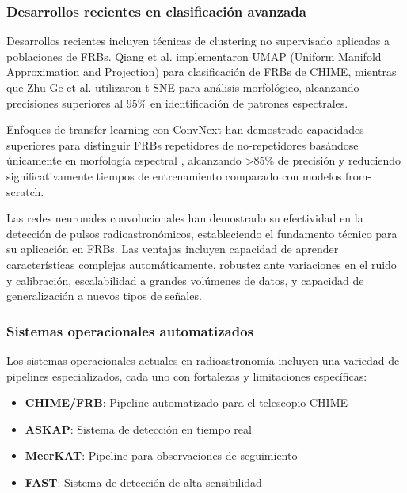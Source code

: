\subsubsection{Desarrollos recientes en clasificación avanzada}

Desarrollos recientes incluyen técnicas de clustering no supervisado aplicadas a poblaciones de FRBs. Qiang et al. \cite{Qiang_2025} implementaron UMAP (Uniform Manifold Approximation and Projection) para clasificación de FRBs de CHIME, mientras que Zhu-Ge et al. \cite{Zhu_Ge_2022} utilizaron t-SNE para análisis morfológico, alcanzando precisiones superiores al 95\% en identificación de patrones espectrales.

Enfoques de transfer learning con ConvNext han demostrado capacidades superiores para distinguir FRBs repetidores de no-repetidores basándose únicamente en morfología espectral \cite{kharel2025repeatingvsnonrepeatingfrbs}, alcanzando >85\% de precisión y reduciendo significativamente tiempos de entrenamiento comparado con modelos from-scratch.

Las redes neuronales convolucionales han demostrado su efectividad en la detección de pulsos radioastronómicos, estableciendo el fundamento técnico para su aplicación en FRBs. Las ventajas incluyen capacidad de aprender características complejas automáticamente, robustez ante variaciones en el ruido y calibración, escalabilidad a grandes volúmenes de datos, y capacidad de generalización a nuevos tipos de señales.

\subsubsection{Sistemas operacionales automatizados}

Los sistemas operacionales actuales en radioastronomía incluyen una variedad de pipelines especializados, cada uno con fortalezas y limitaciones específicas:

\begin{itemize}
    \item \textbf{CHIME/FRB}: Pipeline automatizado para el telescopio CHIME
    \item \textbf{ASKAP}: Sistema de detección en tiempo real
    \item \textbf{MeerKAT}: Pipeline para observaciones de seguimiento
    \item \textbf{FAST}: Sistema de detección de alta sensibilidad
\end{itemize}

